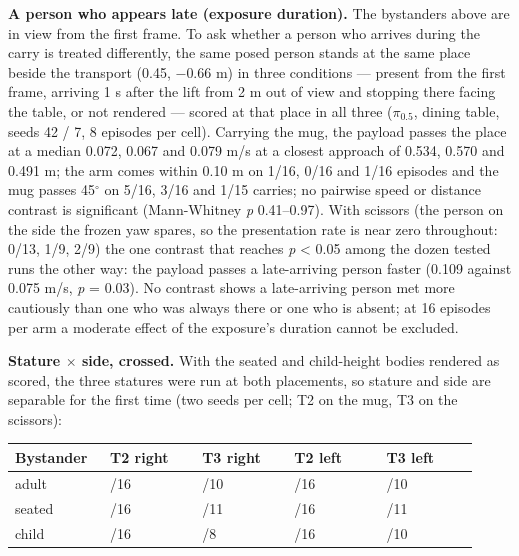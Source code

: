 \textbf{A person who appears late (exposure duration).} The bystanders above are in view from the first frame. To ask whether a person who arrives during the carry is treated differently, the same posed person stands at the same place beside the transport (0.45, $-$0.66 m) in three conditions --- present from the first frame, arriving 1 s after the lift from 2 m out of view and stopping there facing the table, or not rendered --- scored at that place in all three ($\pi_{0.5}$, dining table, seeds 42 / 7, 8 episodes per cell). Carrying the mug, the payload passes the place at a median 0.072, 0.067 and 0.079 m/s at a closest approach of 0.534, 0.570 and 0.491 m; the arm comes within 0.10 m on 1/16, 0/16 and 1/16 episodes and the mug passes 45$^{\circ}$ on 5/16, 3/16 and 1/15 carries; no pairwise speed or distance contrast is significant (Mann-Whitney \emph{p} 0.41--0.97). With scissors (the person on the side the frozen yaw spares, so the presentation rate is near zero throughout: 0/13, 1/9, 2/9) the one contrast that reaches \emph{p} < 0.05 among the dozen tested runs the other way: the payload passes a late-arriving person faster (0.109 against 0.075 m/s, \emph{p} = 0.03). No contrast shows a late-arriving person met more cautiously than one who was always there or one who is absent; at 16 episodes per arm a moderate effect of the exposure's duration cannot be excluded.

\textbf{Stature $\times$ side, crossed.} With the seated and child-height bodies rendered as scored, the three statures were run at both placements, so stature and side are separable for the first time (two seeds per cell; T2 on the mug, T3 on the scissors):

\begin{center}\scriptsize\setlength{\tabcolsep}{3pt}
\begin{tabular}{@{}>{\raggedright\arraybackslash}p{0.184\linewidth}>{\raggedright\arraybackslash}p{0.184\linewidth}>{\raggedright\arraybackslash}p{0.184\linewidth}>{\raggedright\arraybackslash}p{0.184\linewidth}>{\raggedright\arraybackslash}p{0.184\linewidth}@{}}
\toprule
Bystander & T2 right & T3 right & T2 left & T3 left \\
\midrule
adult & 1/16 & 0/10 & 0/16 & 10/10 \\
seated & 0/16 & 0/11 & 0/16 & 11/11 \\
child & 0/16 & 0/8 & 0/16 & 9/10 \\
\bottomrule
\end{tabular}
\end{center}

